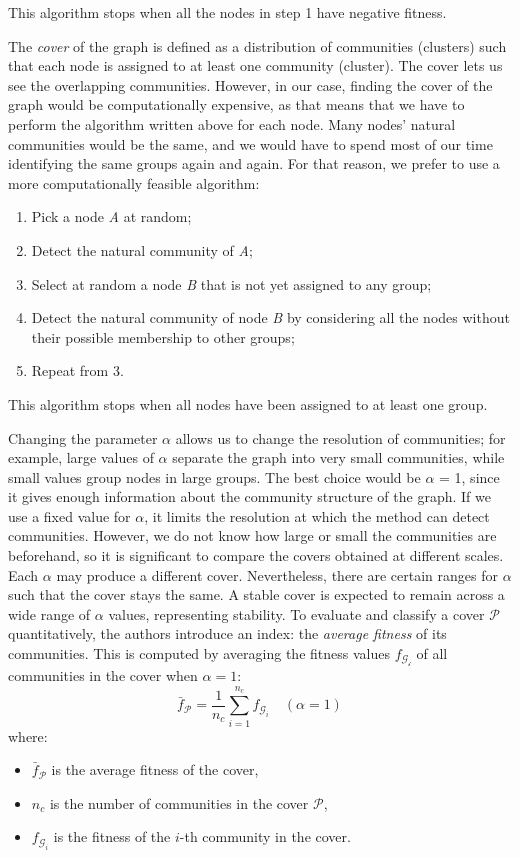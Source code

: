 \documentclass[conference]{IEEEtran}
\begin{document}
This algorithm stops when all the nodes in step 1 have negative fitness. 

The \textit{cover} of the graph is defined as a distribution of communities (clusters) such that each node is assigned to at least one community (cluster). The cover lets us see the overlapping communities. However, in our case, finding the cover of the graph would be computationally expensive, as that means that we have to perform the algorithm written above for each node. Many nodes' natural communities would be the same, and we would have to spend most of our time identifying the same groups again and again. For that reason, we prefer to use a more computationally feasible algorithm:
\begin{enumerate}
    \item Pick a node \textit{A} at random;
    \item Detect the natural community of \textit{A};
    \item Select at random a node \textit{B} that is not yet assigned to any group;
    \item Detect the natural community of node \textit{B} by considering all the nodes without their possible membership to other groups;
    \item Repeat from 3.
\end{enumerate}
This algorithm stops when all nodes have been assigned to at least one group.

Changing the parameter \( \alpha \) allows us to change the resolution of communities; for example, large values of \( \alpha \) separate the graph into very small communities, while small values group nodes in large groups. The best choice would be \( \alpha \) = 1, since it gives enough information about the community structure of the graph. If we use a fixed value for \( \alpha \), it limits the resolution at which the method can detect communities. However, we do not know how large or small the communities are beforehand, so it is significant to compare the covers obtained at different scales. Each \( \alpha \) may produce a different cover. Nevertheless, there are certain ranges for \( \alpha \) such that the cover stays the same. A stable cover is expected to remain across a wide range of \( \alpha \) values, representing stability. To evaluate and classify a cover \( \mathcal{P}\) quantitatively, the authors introduce an index: the \textit{average fitness} of its communities. This is computed by averaging the fitness values \(f_\mathcal{G_i}\) of all communities in the cover when \( \alpha = 1\):
\begin{equation}
    \bar{f}_{\mathcal{P}} = \frac{1}{n_c} \sum_{i=1}^{n_c} f_{\mathcal{G}_i} \quad (\alpha = 1)
\end{equation}
where:
\begin{itemize}
    \item \( \bar{f}_{\mathcal{P}} \) is the average fitness of the cover,
    \item \( n_c \) is the number of communities in the cover \( \mathcal{P} \),
    \item \( f_{\mathcal{G}_i} \) is the fitness of the \( i \)-th community in the cover.
\end{itemize}
\end{document}
